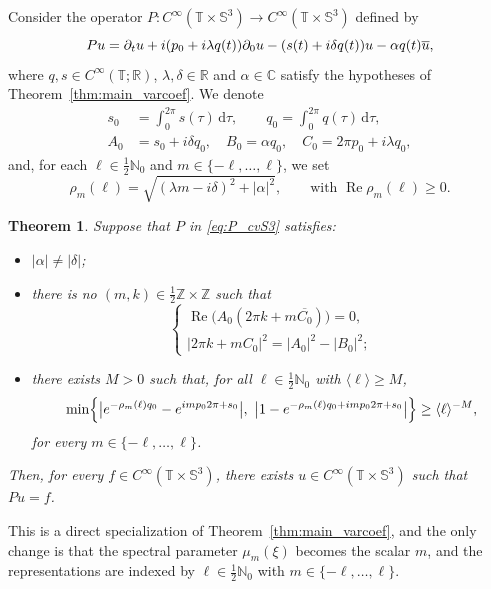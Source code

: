 \documentclass[11pt,reqno]{amsart}
\numberwithin{equation}{section}
\newtheorem{theorem}{Theorem}[section]
\begin{document}
	Consider the operator $P:C^\infty(\mathbb{T}\times \mathbb{S}^3)\to C^\infty(\mathbb{T}\times \mathbb{S}^3)$ defined by \medskip
	\begin{equation}\label{eq:P_cvS3}
		Pu=\partial_tu+i(p_0+i\lambda q(t))\partial_0 u-(s(t)+i\delta q(t))u-\alpha q(t)\overline u, \medskip
	\end{equation}
	where $q,s\in C^\infty(\mathbb{T};\mathbb{R})$, $\lambda,\delta\in\mathbb{R}$ and $\alpha\in\mathbb{C}$ satisfy the hypotheses of Theorem~\ref{thm:main_varcoef}. We denote
	\begin{align*}
		s_0 &=\int_0^{2\pi}s(\tau)\,\mathrm{d}\tau,\qquad
		q_0=\int_0^{2\pi}q(\tau)\,\mathrm{d}\tau, \\[3mm]
		A_0 &=s_0+i\delta q_0,\quad B_0=\alpha q_0,\quad C_0=2\pi p_0+i\lambda q_0,
		\end{align*}
	and, for each $\ell\in \tfrac12\mathbb{N}_0$ and $m\in\{-\ell,\dots,\ell\}$, we set
	\[
	\rho_m(\ell)=\sqrt{(\lambda m-i\delta)^2+|\alpha|^2},
	\qquad \text{with }\operatorname{Re}\rho_m(\ell)\ge 0.
	\]
	
	\begin{theorem}\label{thm:S3_general}
		Suppose that $P$ in \eqref{eq:P_cvS3} satisfies:
		\begin{itemize}
			\item[(I)] $|\alpha|\neq |\delta|$;
			\item[(II)] there is no $(m,k)\in\tfrac12\mathbb{Z}\times\mathbb{Z}$ such that
			\[
			\begin{cases}
				\operatorname{Re}\bigl(A_0(2\pi k+m\overline{C_0})\bigr)=0,\\[2mm]
				|2\pi k+m C_0|^2=|A_0|^2-|B_0|^2;
			\end{cases}
			\]
			\item[(III)] there exists $M>0$ such that, for all $\ell\in\tfrac12\mathbb{N}_0$ with $\langle\ell\rangle\ge M$,
			\[
			\min\Bigl\{\bigl|e^{-\rho_m(\ell) q_0}-e^{im p_0 2\pi+s_0}\bigr|,
			\ \bigl|1-e^{-\rho_m(\ell) q_0+im p_0 2\pi+s_0}\bigr|\Bigr\}\ge \langle\ell\rangle^{-M},
			\]
			for every $m\in\{-\ell,\dots,\ell\}$.
		\end{itemize}
		
		Then, for every $f\in C^\infty(\mathbb{T}\times \mathbb{S}^3)$, there exists $u\in C^\infty(\mathbb{T}\times \mathbb{S}^3)$ such that $Pu=f$.
	\end{theorem}
	

	This is a direct specialization of Theorem~\ref{thm:main_varcoef}, and the only change is that the spectral parameter $\mu_m(\xi)$ becomes the scalar $m$, and the representations are indexed by $\ell\in\tfrac12\mathbb{N}_0$ with $m\in\{-\ell,\dots,\ell\}$. 
	
\end{document}
